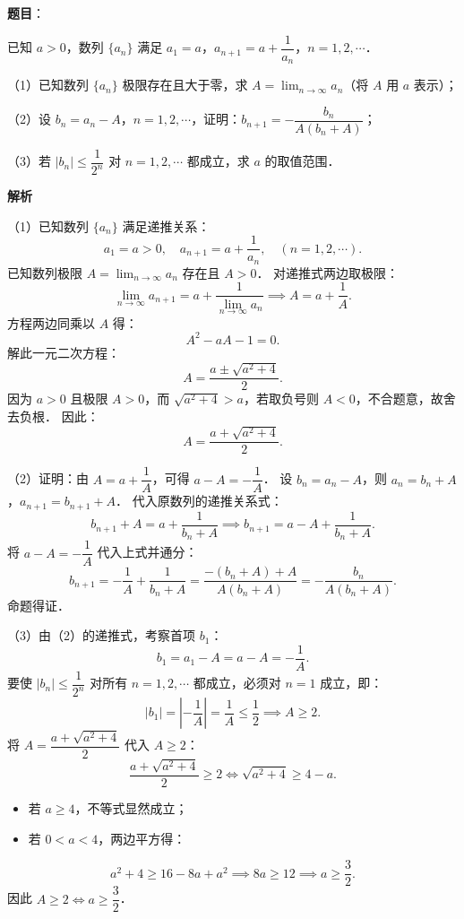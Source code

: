 \begin{answer}

\textbf{题目}：

已知 $a > 0$，数列 $\{a_n\}$ 满足 $a_1 = a$，$a_{n+1} = a + \dfrac{1}{a_n}$，$n = 1, 2, \cdots$．

（1）已知数列 $\{a_n\}$ 极限存在且大于零，求 $A = \lim_{n\to\infty} a_n$（将 $A$ 用 $a$ 表示）；

（2）设 $b_n = a_n - A$，$n = 1, 2, \cdots$，证明：$b_{n+1} = -\dfrac{b_n}{A(b_n + A)}$；

（3）若 $|b_n| \leqslant \dfrac{1}{2^n}$ 对 $n = 1, 2, \cdots$ 都成立，求 $a$ 的取值范围．

\textbf{解析}

（1）已知数列 $\{a_n\}$ 满足递推关系：
\nopagebreak[4]
\[
a_1 = a > 0, \quad a_{n+1} = a + \frac{1}{a_n}, \quad (n = 1, 2, \cdots).
\]
已知数列极限 $A = \lim_{n\to\infty} a_n$ 存在且 $A > 0$．
对递推式两边取极限：
\nopagebreak[4]
\[
\lim_{n\to\infty} a_{n+1} = a + \frac{1}{\lim_{n\to\infty} a_n} \implies A = a + \frac{1}{A}.
\]
方程两边同乘以 $A$ 得：
\nopagebreak[4]
\[
A^2 - aA - 1 = 0.
\]
解此一元二次方程：
\nopagebreak[4]
\[
A = \frac{a \pm \sqrt{a^2 + 4}}{2}.
\]
因为 $a > 0$ 且极限 $A > 0$，而 $\sqrt{a^2 + 4} > a$，若取负号则 $A < 0$，不合题意，故舍去负根．
因此：
\nopagebreak[4]
\[
A = \frac{a + \sqrt{a^2 + 4}}{2}.
\]

（2）证明：由 $A = a + \dfrac{1}{A}$，可得 $a - A = -\dfrac{1}{A}$．
设 $b_n = a_n - A$，则 $a_n = b_n + A$，$a_{n+1} = b_{n+1} + A$．
代入原数列的递推关系式：
\nopagebreak[4]
\[
b_{n+1} + A = a + \frac{1}{b_n + A} \implies b_{n+1} = a - A + \frac{1}{b_n + A}.
\]
将 $a - A = -\dfrac{1}{A}$ 代入上式并通分：
\nopagebreak[4]
\[
b_{n+1} = -\frac{1}{A} + \frac{1}{b_n + A} = \frac{-(b_n + A) + A}{A(b_n + A)} = -\frac{b_n}{A(b_n + A)}.
\]
命题得证．

（3）由（2）的递推式，考察首项 $b_1$：
\nopagebreak[4]
\[
b_1 = a_1 - A = a - A = -\frac{1}{A}.
\]
要使 $|b_n| \leqslant \dfrac{1}{2^n}$ 对所有 $n = 1, 2, \cdots$ 都成立，必须对 $n = 1$ 成立，即：
\nopagebreak[4]
\[
|b_1| = \left|-\frac{1}{A}\right| = \frac{1}{A} \leqslant \frac{1}{2} \implies A \geqslant 2.
\]
将 $A = \dfrac{a + \sqrt{a^2 + 4}}{2}$ 代入 $A \geqslant 2$：
\nopagebreak[4]
\[
\frac{a + \sqrt{a^2 + 4}}{2} \geqslant 2 \iff \sqrt{a^2 + 4} \geqslant 4 - a.
\]
\begin{itemize}
\item 若 $a \geqslant 4$，不等式显然成立；
\item 若 $0 < a < 4$，两边平方得：
\end{itemize}
\nopagebreak[4]
\[
a^2 + 4 \geqslant 16 - 8a + a^2 \implies 8a \geqslant 12 \implies a \geqslant \frac{3}{2}.
\]
因此 $A \geqslant 2 \iff a \geqslant \dfrac{3}{2}$．


\end{answer}
